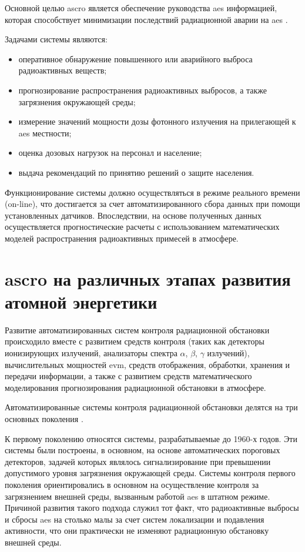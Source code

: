 Основной целью \ac{ascro} является обеспечение руководства \ac{aes} информацией, которая способствует минимизации 
последствий радиационной аварии на \ac{aes} \cite{elokhin}.

Задачами системы являются:

\begin{itemize}
	\item оперативное обнаружение повышенного или аварийного выброса радиоактивных веществ;
	\item прогнозирование распространения радиоактивных выбросов, а также загрязнения окружающей среды;
	\item измерение значений мощности дозы фотонного излучения на прилегающей к \ac{aes} местности;
	\item оценка дозовых нагрузок на персонал и население;
	\item выдача рекомендаций по принятию решений о защите населения.
\end{itemize}

Функционирование системы должно осуществляться в режиме реального времени (on-line), что достигается за счет 
автоматизированного сбора данных при помощи установленных датчиков. Впоследствии, на основе полученных данных 
осуществляется прогностические расчеты с использованием математических моделей распространения радиоактивных примесей в 
атмосфере.

\section{\ac{ascro} на различных этапах развития атомной энергетики}

Развитие автоматизированных систем контроля радиационной обстановки происходило вместе с развитием средств контроля
(таких как детекторы ионизирующих излучений, анализаторы спектра $\alpha$, $\beta$, $\gamma$ излучений), вычислительных 
мощностей \ac{evm}, средств отображения, обработки, хранения и передачи информации, а также с развитием средств 
математического моделирования прогнозирования радиационной обстановки в атмосфере.

Автоматизированные системы контроля радиационной обстановки делятся на три основных поколения \cite{elokhin}.

К первому поколению относятся системы, разрабатываемые до 1960-х годов. Эти системы были построены, в основном, на 
основе автоматических пороговых детекторов, задачей которых являлось сигнализирование при превышении допустимого уровня 
загрязнения окружающей среды. Системы контроля первого поколения ориентировались в основном на осуществление контроля 
за загрязнением внешней среды, вызванным работой \ac{aes} в штатном режиме. Причиной развития такого подхода служил тот 
факт, что радиоактивные выбросы и сбросы \ac{aes} на столько малы за счет систем локализации и подавления активности, 
что они практически не изменяют радиационную обстановку внешней среды.

